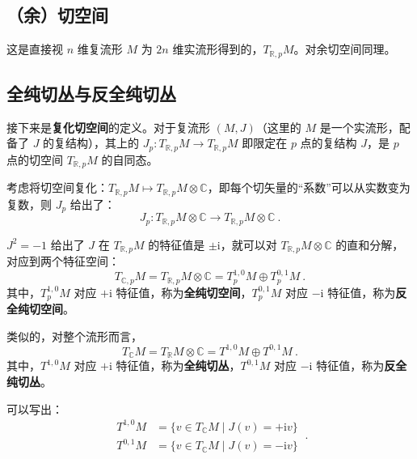 

\subsection{（余）切空间}
这是直接视 $n$ 维复流形 $M$ 为 $2n$ 维实流形得到的，$T_{\mathbb R, p} M$。对余切空间同理。

\subsection{全纯切丛与反全纯切丛}
接下来是\textbf{复化切空间}的定义。对于复流形 $(M, J)$（这里的 $M$ 是一个实流形，配备了 $J$ 的复结构），其上的 $J_p: T_{\mathbb R,p} M \to T_{\mathbb R, p} M$ 即限定在 $p$ 点的复结构 $J$，是 $p$ 点的切空间 $T_{\mathbb R, p} M$ 的自同态。

考虑将切空间复化：$T_{\mathbb R, p} M \mapsto T_{\mathbb R, p} M \otimes \mathbb C$，即每个切矢量的“系数”可以从实数变为复数，则 $J_p$ 给出了：
\begin{equation}
J_p : T_{\mathbb R,p} M \otimes \mathbb C \to T_{\mathbb R, p} M \otimes \mathbb C ~.
\end{equation}

$J^2 = -1$ 给出了 $J$ 在 $T_{\mathbb R, p} M$ 的特征值是 $\pm \mathrm i$，就可以对 $T_{\mathbb R, p} M \otimes \mathbb C$ 的直和分解，对应到两个特征空间：
\begin{equation}
T_{\mathbb C, p} M = T_{\mathbb R, p} M \otimes \mathbb C = T_p^{1, 0} M \oplus T_p^{0, 1} M ~.
\end{equation}
其中，$T_p^{1, 0} M$ 对应 $+\mathrm i$ 特征值，称为\textbf{全纯切空间}，$T_p^{0, 1} M$ 对应 $-\mathrm i$ 特征值，称为\textbf{反全纯切空间}。


类似的，对整个流形而言，
\begin{equation}
T_{\mathbb C} M = T_\mathbb R M \otimes \mathbb C = T^{1, 0} M \oplus T^{0, 1} M ~.
\end{equation}
其中，$T^{1, 0} M$ 对应 $+\mathrm i$ 特征值，称为\textbf{全纯切丛}，$T^{0, 1} M$ 对应 $-\mathrm i$ 特征值，称为\textbf{反全纯切丛}。

可以写出：
\begin{equation}
\begin{aligned}
T^{1, 0} M &= \{v \in T_{\mathbb C} M \mid J(v) = +\mathrm i v\} \\
T^{0, 1} M &= \{v \in T_{\mathbb C} M \mid J(v) = -\mathrm i v\} 
\end{aligned} ~.
\end{equation}

